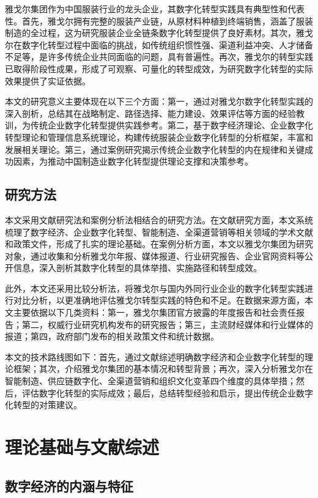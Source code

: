 \documentclass[12pt,a4paper]{article}
\begin{document}
雅戈尔集团作为中国服装行业的龙头企业，其数字化转型实践具有典型性和代表性。首先，雅戈尔拥有完整的服装产业链，从原材料种植到终端销售，涵盖了服装制造的全过程，这为研究服装企业全链条数字化转型提供了良好素材。其次，雅戈尔在数字化转型过程中面临的挑战，如传统组织惯性强、渠道利益冲突、人才储备不足等，是许多传统企业共同面临的问题，具有普遍性。再次，雅戈尔的转型实践已取得阶段性成果，形成了可观察、可量化的转型成效，为研究数字化转型的实际效果提供了实证依据。

本文的研究意义主要体现在以下三个方面：第一，通过对雅戈尔数字化转型实践的深入剖析，总结其在战略制定、路径选择、能力建设、效果评估等方面的经验教训，为传统企业数字化转型提供实践参考。第二，基于数字经济理论、企业数字化转型理论和管理信息系统理论，构建传统服装企业数字化转型的分析框架，丰富和发展相关理论。第三，通过案例研究揭示传统企业数字化转型的内在规律和关键成功因素，为推动中国制造业数字化转型提供理论支撑和决策参考。

\subsection{研究方法}

本文采用文献研究法和案例分析法相结合的研究方法。在文献研究方面，本文系统梳理了数字经济、企业数字化转型、智能制造、全渠道营销等相关领域的学术文献和政策文件，形成了扎实的理论基础。在案例分析方面，本文以雅戈尔集团为研究对象，通过收集和分析雅戈尔年报、媒体报道、行业研究报告、企业官网资料等公开信息，深入剖析其数字化转型的具体举措、实施路径和转型成效。

此外，本文还采用比较分析法，将雅戈尔与国内外同行业企业的数字化转型实践进行对比分析，以更准确地评估雅戈尔转型实践的特色和不足。在数据来源方面，本文主要依据以下几类资料：第一，雅戈尔集团官方披露的年度报告和社会责任报告；第二，权威行业研究机构发布的研究报告；第三，主流财经媒体和行业媒体的报道；第四，政府部门发布的相关政策文件和统计数据。

本文的技术路线图如下：首先，通过文献综述明确数字经济和企业数字化转型的理论框架；其次，介绍雅戈尔集团的基本情况和转型背景；再次，深入分析雅戈尔在智能制造、供应链数字化、全渠道营销和组织文化变革四个维度的具体举措；然后，评估数字化转型的实际成效；最后，总结转型经验和启示，提出传统企业数字化转型的对策建议。

\newpage

\section{理论基础与文献综述}

\subsection{数字经济的内涵与特征}
\end{document}
